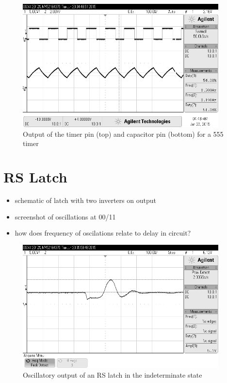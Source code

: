 \documentclass[11pt]{article}
\begin{document}
\begin{figure}[htpb]
	\centering
	\includegraphics[width=0.95\textwidth]{timer}
	\caption{Output of the timer pin (top) and capacitor pin (bottom) for a 555 timer}
	\label{fig:timer}
\end{figure}

\section{RS Latch}
\begin{itemize}
	\item schematic of latch with two inverters on output
	\item screenshot of oscillations at 00/11
	\item how does frequency of oscilations relate to delay in circuit?
\end{itemize}

\begin{figure}[htpb]
	\centering
	\includegraphics[width=0.95\textwidth]{rs_latch}
	\caption{Oscillatory output of an RS latch in the indeterminate state}
	\label{fig:rs_latch}
\end{figure}
\end{document}
